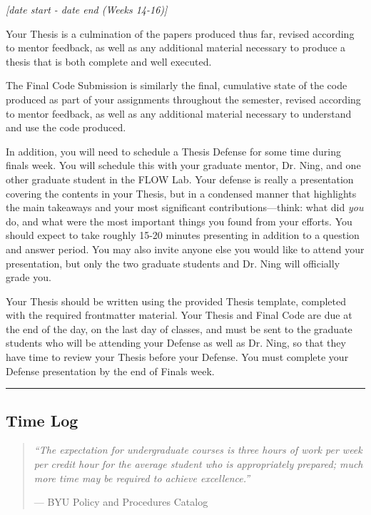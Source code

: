 \documentclass[12pt]{article}
\begin{document}
\textit{[date start - date end (Weeks 14-16)]}

\bigskip

Your Thesis is a culmination of the papers produced thus far, revised according to mentor feedback, as well as any additional material necessary to produce a thesis that is both complete and well executed.

The Final Code Submission is similarly the final, cumulative state of the code produced as part of your assignments throughout the semester, revised according to mentor feedback, as well as any additional material necessary to understand and use the code produced.

In addition, you will need to schedule a Thesis Defense for some time during finals week.
You will schedule this with your graduate mentor, Dr. Ning, and one other graduate student in the FLOW Lab.
Your defense is really a presentation covering the contents in your Thesis, but in a condensed manner that highlights the main takeaways and your most significant contributions---think: what did \textit{you} do, and what were the most important things you found from your efforts.
You should expect to take roughly 15-20 minutes presenting in addition to a question and answer period.
You may also invite anyone else you would like to attend your presentation, but only the two graduate students and Dr. Ning will officially grade you.

Your Thesis should be written using the provided Thesis template, completed with the required frontmatter material.
Your Thesis and Final Code are due at the end of the day, on the last day of classes, and must be sent to the graduate students who will be attending your Defense as well as Dr. Ning, so that they have time to review your Thesis before your Defense.
You must complete your Defense presentation by the end of Finals week.


\vspace{1em}\hrule\vspace{1em}
\subsection{Time Log}
\label{sec:timelog}

\begin{quote}
	\textit{``The expectation for undergraduate courses is three hours of work per week per credit hour for the average student who is appropriately prepared; much more time may be required to achieve excellence.'' }
	
	--- BYU Policy and Procedures Catalog
\end{quote}
\end{document}
